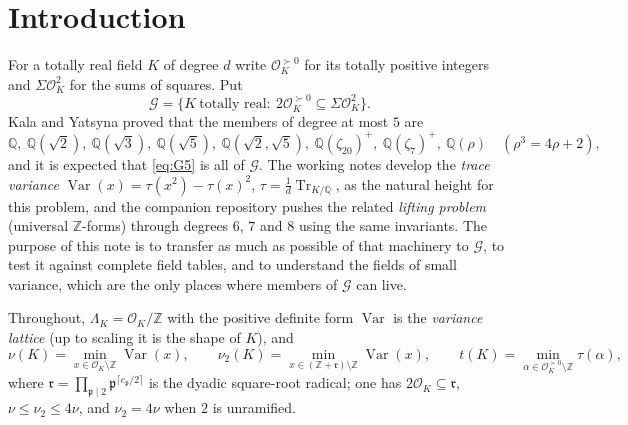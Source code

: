 \documentclass[11pt,reqno]{amsart}
\theoremstyle{plain}
\theoremstyle{definition}
\newcommand{\Z}{\mathbb{Z}}
\newcommand{\Q}{\mathbb{Q}}
\newcommand{\OK}{\mathcal{O}_K}
\newcommand{\rr}{\mathfrak{r}}
\newcommand{\pp}{\mathfrak{p}}
\newcommand{\Gcl}{\mathcal{G}}
\newcommand{\SoS}{\Sigma\OK^{2}}
\newcommand{\tp}{\succ 0}
\DeclareMathOperator{\Var}{Var}
\DeclareMathOperator{\Tr}{Tr}
\begin{document}
\begin{abstract}
(v) We record shape and arithmetic-statistics data from the census, and explicit witnesses for the
seven smallest non-member real cyclotomic fields left open by the dyadic criterion
($m=36$, $44$, $52$, $76$, $100$, $108$, $116$).
\end{abstract}

\maketitle
\tableofcontents

\section{Introduction}\label{sec:intro}

For a totally real field $K$ of degree $d$ write $\OK^{\tp}$ for its totally positive integers and
$\SoS$ for the sums of squares. Put
\[
 \Gcl=\{K\ \text{totally real}:\ 2\OK^{\tp}\subseteq\SoS\}.
\]
Kala and Yatsyna \cite{KY} proved that the members of degree at most $5$ are
\begin{equation}\label{eq:G5}
 \Q,\ \Q(\sqrt2),\ \Q(\sqrt3),\ \Q(\sqrt5),\ \Q(\sqrt2,\sqrt5),\ \Q(\zeta_{20})^{+},\ \Q(\zeta_7)^{+},\
 \Q(\rho)\quad(\rho^3=4\rho+2),
\end{equation}
and it is expected that \eqref{eq:G5} is all of $\Gcl$. The working notes \cite{PB,PD,PR} develop
the \emph{trace variance} $\Var(x)=\tau(x^{2})-\tau(x)^{2}$, $\tau=\frac1d\Tr_{K/\Q}$, as the natural
height for this problem, and the companion repository \cite{TwoO} pushes the related \emph{lifting
problem} (universal $\Z$-forms) through degrees $6$, $7$ and $8$ using the same invariants. The
purpose of this note is to transfer as much as possible of that machinery to $\Gcl$, to test it
against complete field tables, and to understand the fields of small variance, which are the only
places where members of $\Gcl$ can live.

Throughout, $\Lambda_K=\OK/\Z$ with the positive definite form $\Var$ is the \emph{variance lattice}
(up to scaling it is the shape of $K$), and
\[
 \nu(K)=\min_{x\in\OK\setminus\Z}\Var(x),\qquad
 \nu_2(K)=\min_{x\in(\Z+\rr)\setminus\Z}\Var(x),\qquad
 t(K)=\min_{\alpha\in\OK^{\tp}\setminus\Z}\tau(\alpha),
\]
where $\rr=\prod_{\pp\mid2}\pp^{\lceil e_\pp/2\rceil}$ is the dyadic square-root radical; one has
$2\OK\subseteq\rr$, $\nu\le\nu_2\le4\nu$, and $\nu_2=4\nu$ when $2$ is unramified.
\end{document}
